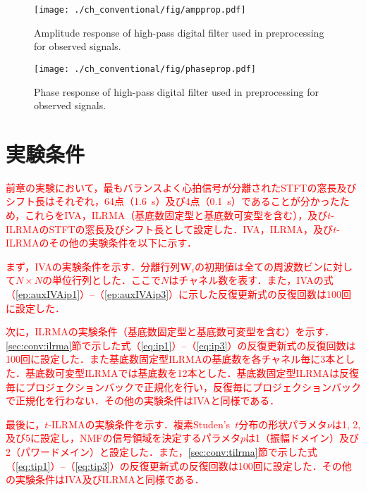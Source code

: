 \begin{figure}[!t]
\centering
\texttt{[image: ./ch\_conventional/fig/ampprop.pdf]}
\caption{Amplitude response of high-pass digital filter used in preprocessing for observed signals.}
\label{fig:ampres}
\end{figure}

\begin{figure}[!t]
\centering
\texttt{[image: ./ch\_conventional/fig/phaseprop.pdf]}
\caption{Phase response of high-pass digital filter used in preprocessing for observed signals.}
\label{fig:phaseres}
\end{figure}

\section{実験条件}
\label{sec:conv:expcond5}

\textcolor{red}{前章の実験において，最もバランスよく心拍信号が分離されたSTFTの窓長及びシフト長はそれぞれ，64点（1.6~s）及び4点（0.1~s）であることが分かったため，これらをIVA，ILRMA（基底数固定型と基底数可変型を含む），及び$t$-ILRMAのSTFTの窓長及びシフト長として設定した．IVA，ILRMA，及び$t$-ILRMAのその他の実験条件を以下に示す．}

\textcolor{red}{まず，IVAの実験条件を示す．分離行列$\bm{W}_{i}$の初期値は全ての周波数ビンに対して$N\times N$の単位行列とした．ここで$N$はチャネル数を表す．また，IVAの式（\ref{ep:auxIVAip1}）--（\ref{ep:auxIVAip3}）に示した反復更新式の反復回数は100回に設定した．}

\textcolor{red}{次に，ILRMAの実験条件（基底数固定型と基底数可変型を含む）を示す．\ref{sec:conv:ilrma}節で示した式（\ref{eq:ip1}）--（\ref{eq:ip3}）の反復更新式の反復回数は100回に設定した．また基底数固定型ILRMAの基底数を各チャネル毎に3本とした．基底数可変型ILRMAでは基底数を12本とした．基底数固定型ILRMAは反復毎にプロジェクションバックで正規化を行い，反復毎にプロジェクションバックで正規化を行わない．その他の実験条件はIVAと同様である．}

\textcolor{red}{最後に，$t$-ILRMAの実験条件を示す．複素Studen's~$t$分布の形状パラメタ$\nu$は1, 2, 及び5に設定し，NMFの信号領域を決定するパラメタ$p$は1（振幅ドメイン）及び2（パワードメイン）と設定した．また，\ref{sec:conv:tilrma}節で示した式（\ref{eq:tip1}）--（\ref{eq:tip3}）の反復更新式の反復回数は100回に設定した．その他の実験条件はIVA及びILRMAと同様である．}


